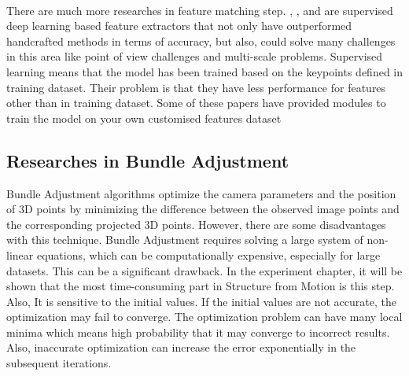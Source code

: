 \documentclass[11pt]{article}
\begin{document}
    \paragraph{} There are much more researches in feature matching step. \cite{revaud2019r2d2}, \cite{dusmanu2019d2net},
    and \cite{detone2018superpoint} are supervised deep learning based feature extractors that not only have
    outperformed handcrafted methods in terms of accuracy, but also, could solve many challenges in this area like
    point of view challenges and multi-scale problems. Supervised learning means that the model has been trained
    based on the keypoints defined in training dataset. Their problem is that they have less performance for features other
    than in training dataset. Some of these papers have provided modules to train the model on your own customised features dataset

    \newpage
    \subsection{Researches in Bundle Adjustment}
    Bundle Adjustment algorithms optimize the camera parameters and the position of 3D points by minimizing the
    difference between the observed image points and the corresponding projected 3D points. However, there
    are some disadvantages with this technique. Bundle Adjustment requires solving a large system of
    non-linear equations, which can be computationally expensive, especially for large datasets. This can be a
    significant drawback. In the experiment chapter, it will be shown that the most time-consuming part in Structure from Motion is this step.
    Also, It is sensitive to the initial values. If the initial values are not accurate, the optimization may fail to converge.
    The optimization problem can have many local minima which means high probability that it may converge to incorrect results.
    Also, inaccurate optimization can increase the error exponentially in the subsequent iterations.
\end{document}

